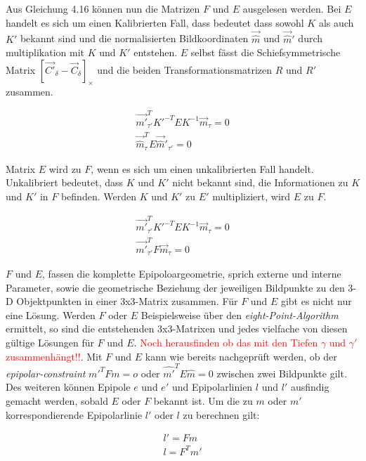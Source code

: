  Aus Gleichung 4.16 können nun die Matrizen $F$ und $E$ ausgelesen werden. Bei $E$ handelt es sich um einen Kalibrierten Fall, dass bedeutet dass sowohl $K$ als auch $K'$ bekannt sind und die normalisierten Bildkoordinaten $\vec{\hat{m}}$ und $\vec{\hat{m}}'$  durch multiplikation mit $K$ und $K'$ entstehen. $E$ selbst fässt die Schiefsymmetrische Matrix $[\vec{C'}_\delta - \vec{C}_\delta]_\times$ und die beiden Transformationsmatrizen $R$ und $R'$ zusammen. 
 
 \begin{gather}
 	\vec{m'}_{\tau'}^T K'^{-T}EK^{-1}\vec{m}_\tau = 0\\
 	\vec{\hat{m}}_\tau^T E \vec{\hat{m}}'_{\tau'} = 0
 \end{gather}
 
 Matrix $E$ wird zu $F$, wenn es sich um einen unkalibrierten Fall handelt. Unkalibriert bedeutet, dass $K$ und $K'$ nicht bekannt sind, die Informationen zu $K$ und $K'$ in $F$ befinden. Werden $K$ und $K'$ zu $E'$ multipliziert, wird $E$ zu $F$. 
 
 \begin{gather}
 	\vec{m'}_{\tau'}^T K'^{-T}EK^{-1}\vec{m}_\tau = 0\\
 	\vec{m'}_{\tau'}^T F\vec{m}_\tau = 0
 \end{gather}
 
 $F$ und $E$, fassen die komplette Epipoloargeometrie, sprich externe und interne Parameter, sowie die geometrische Beziehung der jeweiligen Bildpunkte zu den 3-D Objektpunkten in einer 3x3-Matrix zusammen. Für $F$ und $E$ gibt es nicht nur eine Lösung. Werden $F$ oder $E$ Beispielsweise über den \textit{eight-Point-Algorithm} ermittelt, so sind die entstehenden 3x3-Matrixen und jedes vielfache von diesen gültige Lösungen für $F$ und $E$\cite{HZ,HZ8}. \textcolor{red}{Noch herausfinden ob das mit den Tiefen $\gamma$ und $\gamma'$ zusammenhängt!!}. Mit $F$ und $E$ kann wie bereits nachgeprüft werden, ob der \textit{epipolar-constraint} $m'^TFm = o$ oder $\hat{m'}^TE\hat{m} = 0$ zwischen zwei Bildpunkte gilt. Des weiteren können Epipole $e$ und $e'$ und Epipolarlinien $l$ und $l'$ ausfindig gemacht werden, sobald $E$ oder $F$ bekannt ist\cite{HZ,Elements,HZ8,ZZGXr}. Um die zu $m$ oder $m'$ korrespondierende Epipolarlinie $l'$ oder $l$ zu berechnen gilt:
 
 \begin{gather}
 	l' = Fm\\
 	l = F^Tm'
 \end{gather} 
 
